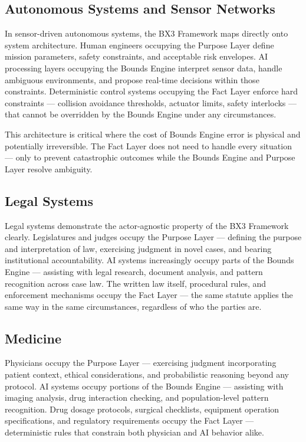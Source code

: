 \documentclass[12pt]{article}
\begin{document}
\subsection{Autonomous Systems and Sensor Networks}

In sensor-driven autonomous systems, the BX3 Framework maps directly onto system architecture. Human engineers occupying the Purpose Layer define mission parameters, safety constraints, and acceptable risk envelopes. AI processing layers occupying the Bounds Engine interpret sensor data, handle ambiguous environments, and propose real-time decisions within those constraints. Deterministic control systems occupying the Fact Layer enforce hard constraints --- collision avoidance thresholds, actuator limits, safety interlocks --- that cannot be overridden by the Bounds Engine under any circumstances.

This architecture is critical where the cost of Bounds Engine error is physical and potentially irreversible. The Fact Layer does not need to handle every situation --- only to prevent catastrophic outcomes while the Bounds Engine and Purpose Layer resolve ambiguity.

\subsection{Legal Systems}

Legal systems demonstrate the actor-agnostic property of the BX3 Framework clearly. Legislatures and judges occupy the Purpose Layer --- defining the purpose and interpretation of law, exercising judgment in novel cases, and bearing institutional accountability. AI systems increasingly occupy parts of the Bounds Engine --- assisting with legal research, document analysis, and pattern recognition across case law. The written law itself, procedural rules, and enforcement mechanisms occupy the Fact Layer --- the same statute applies the same way in the same circumstances, regardless of who the parties are.

\subsection{Medicine}

Physicians occupy the Purpose Layer --- exercising judgment incorporating patient context, ethical considerations, and probabilistic reasoning beyond any protocol. AI systems occupy portions of the Bounds Engine --- assisting with imaging analysis, drug interaction checking, and population-level pattern recognition. Drug dosage protocols, surgical checklists, equipment operation specifications, and regulatory requirements occupy the Fact Layer --- deterministic rules that constrain both physician and AI behavior alike.
\end{document}
